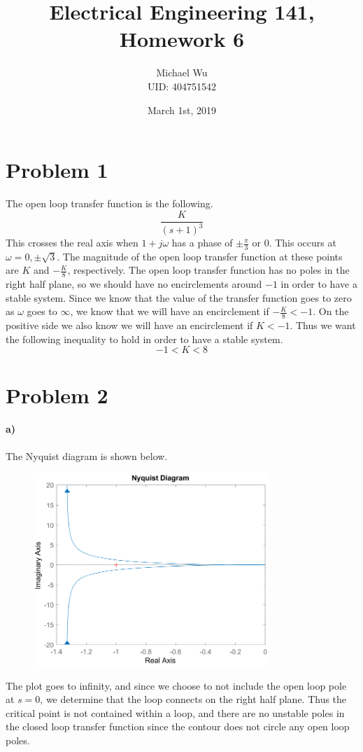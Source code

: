 \documentclass[12pt]{article}
\begin{document}
\title{Electrical Engineering 141, Homework 6}
\date{March 1st, 2019}
\author{Michael Wu\\UID: 404751542}
\maketitle

\section*{Problem 1}

The open loop transfer function is the following.
\[\frac{K}{(s+1)^3}\]
This crosses the real axis when \(1+j\omega\) has a phase of \(\pm \frac{\pi}{3}\) or \(0\). This occurs
at \(\omega=0,\pm\sqrt{3}\). The magnitude of the open loop transfer function at these points are
\(K\) and \(-\frac{K}{8}\), respectively. The open loop transfer function has no poles in the right half
plane, so we should have no encirclements around \(-1\) in order to have a stable system. Since we know
that the value of the transfer function goes to zero as \(\omega\) goes to \(\infty\), we know that we
will have an encirclement if \(-\frac{K}{8}<-1\). On the positive side we also know we will have an
encirclement if \(K<-1\). Thus we want the following inequality to hold in order to have a stable system.
\[-1<K<8\]

\section*{Problem 2}

\paragraph{a)}

The Nyquist diagram is shown below.
\begin{figure}[H]
    \begin{center}
        \includegraphics[width=3.5in]{problem2a.pdf}
    \end{center}
\end{figure}
The plot goes to infinity, and since we choose to not include the open loop pole at \(s=0\), we determine
that the loop connects on the right half plane. Thus the critical point is not contained within a loop, and
there are no unstable poles in the closed loop transfer function since the contour does not circle any open
loop poles.
\end{document}
